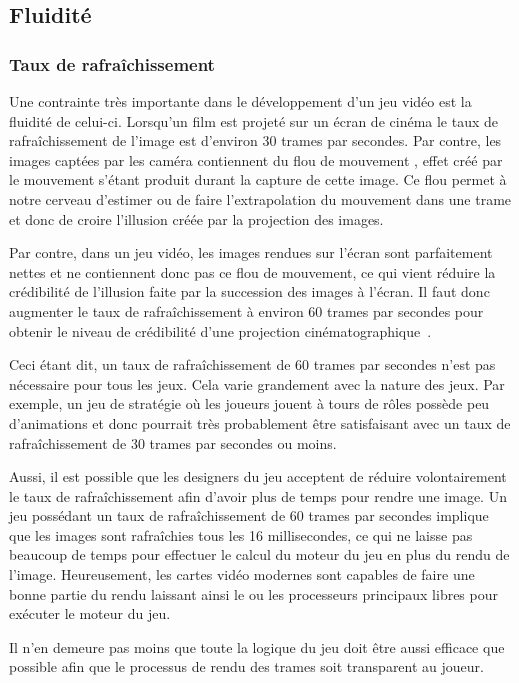 \documentclass[12pt,twoside,letterpaper,francais]{book}
\begin{document}
\FloatBarrier
\subsection{Fluidité}
\subsubsection{Taux de rafraîchissement}
Une contrainte très importante dans le développement d'un jeu vidéo
est la fluidité de celui-ci. Lorsqu'un film est projeté sur un écran
de cinéma le taux de rafraîchissement de l'image est d'environ 30
trames par secondes. Par contre, les images captées par les caméra
contiennent du \og flou de mouvement \fg, effet créé par le mouvement
s'étant produit durant la capture de cette image. Ce flou permet à
notre cerveau d'estimer ou de faire l'extrapolation du mouvement dans
une trame et donc de croire l'illusion créée par la projection des
images.

Par contre, dans un jeu vidéo, les images rendues sur l'écran sont
parfaitement nettes et ne contiennent donc pas ce flou de mouvement,
ce qui vient réduire la crédibilité de l'illusion faite par la
succession des images à l'écran. Il faut donc augmenter le taux de
rafraîchissement à environ 60 trames par secondes pour obtenir le
niveau de crédibilité d'une projection
cinématographique~\cite{30vs60}.

Ceci étant dit, un taux de rafraîchissement de 60 trames par secondes
n'est pas nécessaire pour tous les jeux. Cela varie grandement avec la
nature des jeux. Par exemple, un jeu de stratégie où les joueurs
jouent à tours de rôles possède peu d'animations et donc pourrait très
probablement être satisfaisant avec un taux de rafraîchissement de 30
trames par secondes ou moins.

Aussi, il est possible que les designers du jeu acceptent de réduire
volontairement le taux de rafraîchissement afin d'avoir plus de temps
pour rendre une image. Un jeu possédant un taux de rafraîchissement de
60 trames par secondes implique que les images sont rafraîchies tous
les 16 millisecondes, ce qui ne laisse pas beaucoup de temps pour
effectuer le calcul du moteur du jeu en plus du rendu de
l'image. Heureusement, les cartes vidéo modernes sont capables de
faire une bonne partie du rendu laissant ainsi le ou les processeurs
principaux libres pour exécuter le moteur du jeu.

Il n'en demeure pas moins que toute la logique du jeu doit être aussi
efficace que possible afin que le processus de rendu des trames soit
transparent au joueur.
\end{document}
